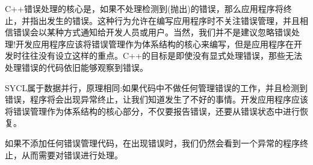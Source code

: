 C++错误处理的核心是，如果不处理检测到(抛出)的错误，那么应用程序将终止，并指出发生的错误。这种行为允许在编写应用程序时不关注错误管理，并且相信错误会以某种方式通知给开发人员或用户。当然，我们并不是建议忽略错误处理!开发应用程序应该将错误管理作为体系结构的核心来编写，但是应用程序在开发时往往没有设立这样的重点。C++的目标是即使没有显式处理错误，那些无法处理错误的代码依旧能够观察到错误。\par

SYCL属于数据并行，原理相同:如果代码中不做任何管理错误的工作，并且检测到错误，程序将会出现异常终止，让我们知道发生了不好的事情。开发应用程序应该将错误管理作为体系结构的核心部分，不仅要报告错误，还要从错误状态中进行恢复。\par

\begin{tcolorbox}[colback=red!5!white,colframe=red!75!black]
如果不添加任何错误管理代码，在出现错误时，我们仍然会看到一个异常的程序终止，从而需要对错误进行处理。
\end{tcolorbox}


























